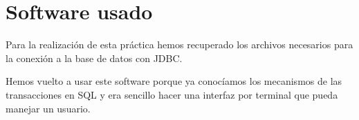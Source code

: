 \section{Software usado}
Para la realización de esta práctica hemos recuperado los archivos necesarios para
la conexión a la base de datos con JDBC.

Hemos vuelto a usar este software porque ya conocíamos los mecanismos de las
transacciones en SQL y era sencillo hacer una interfaz por terminal que pueda
manejar un usuario.
